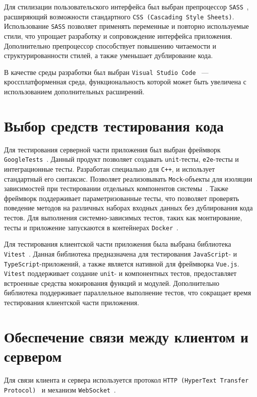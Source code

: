 Для стилизации пользовательского интерфейса был выбран препроцессор \texttt{SASS}~\cite{SASS}, расширяющий возможности
стандартного \texttt{CSS (Cascading Style Sheets)}. Использование \texttt{SASS} позволяет применять переменные и повторно используемые стили, 
что упрощает разработку и сопровождение интерфейса приложения. Дополнительно препроцессор способствует повышению 
читаемости и структурированности стилей, а также уменьшает дублирование кода.

В качестве среды разработки был выбран \texttt{Visual Studio Code}~\cite{VSCode} --- кроссплатформенная среда,
функциональность которой может быть увеличена с использованием дополнительных расширений.

\section{Выбор средств тестирования кода}

Для тестирования серверной части приложения был выбран фреймворк \texttt{GoogleTests}~\cite{GoogleTests}. 
Данный продукт позволяет создавать \texttt{unit}-тесты, \texttt{e2e}-тесты и интеграционные тесты. Разработан специально 
для \texttt{C++}, и использует стандартный его синтаксис. Позволяет реализовывать \texttt{Mock}-объекты для изоляции 
зависимостей при тестировании отдельных компонентов системы~\cite{Mocks}. Также фреймворк поддерживает 
параметризованные тесты, что позволяет проверять поведение методов на различных наборах входных 
данных без дублирования кода тестов. Для выполнения системно-зависимых тестов, таких как монтирование,
тесты и приложение запускаются в контейнерах \texttt{Docker}~\cite{Docker}.

Для тестирования клиентской части приложения была выбрана библиотека \texttt{Vitest}~\cite{ViTest}. 
Данная библиотека предназначена для тестирования \texttt{JavaScript}- и \texttt{TypeScript}-приложений, а также 
является нативной для фреймворка \texttt{Vue.js}. \texttt{Vitest} поддерживает создание \texttt{unit}- и компонентных тестов, 
предоставляет встроенные средства мокирования функций и модулей. Дополнительно библиотека поддерживает 
параллельное выполнение тестов, что сокращает время тестирования клиентской части приложения.

\section{Обеспечение связи между клиентом и сервером}

Для связи клиента и сервера используется протокол \texttt{HTTP (HyperText Transfer Protocol)}~\cite{HTTP} и механизм 
\texttt{WebSocket}~\cite{WebSocket}.

